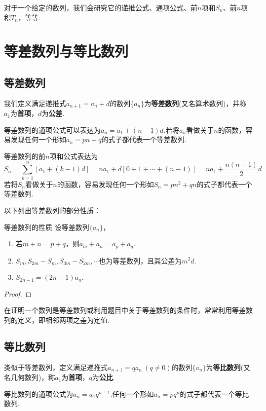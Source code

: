 \documentclass[lang=cn, zihao=5]{elegantbook}
\begin{document}
对于一个给定的数列，我们会研究它的递推公式、通项公式、前$n$项和$S_n$、前$n$项积$T_n$，等等.

\section{等差数列与等比数列}

\subsection{等差数列}

我们定义满足递推式$a_{n+1}=a_n+d$的数列$\{ a_n \}$为\textbf{等差数列}(又名算术数列)，并称$a_1$为\textbf{首项}，$d$为\textbf{公差}.

等差数列的通项公式可以表达为$a_n=a_1+(n-1)d$.若将$a_n$看做关于$n$的函数，容易发现任何一个形如$a_n=pn+q$的式子都代表一个等差数列.

等差数列的前$n$项和公式表达为$$S_n = \sum _{k=1}^{n} [a_1+(k-1)d] = na_1 + d[0+ 1 + \cdots +(n-1)] = na_1 + \frac{n(n-1)}{2}d$$
若将$S_n$看做关于$n$的函数，容易发现任何一个形如$S_n=pn^2+qn$的式子都代表一个等差数列.

以下列出等差数列的部分性质：

\begin{proposition}{等差数列的性质}
	设等差数列$\{ a_n \}$，
	\begin{enumerate}
		\item 若$m+n=p+q$，则$a_m+a_n=a_p+a_q$.
		\item $S_m,S_{2m}-S_m,S_{3m}-S_{2m},\cdots $也为等差数列，且其公差为$m^2d$.
		\item $S_{2n-1}=(2n-1)a_n$.
	\end{enumerate}
\end{proposition}
\begin{proof}
\end{proof}

在证明一个数列是等差数列或利用题目中关于等差数列的条件时，常常利用等差数列的定义，即相邻两项之差为定值.

\subsection{等比数列}

类似于等差数列，定义满足递推式$a_{n+1}=qa_n ~(q \neq 0)$的数列$\{ a_n \}$为\textbf{等比数列}(又名几何数列)，称$a_1$为\textbf{首项}，$q$为\textbf{公比}.

等比数列的通项公式为$a_n = a_1 q^{n-1}$.任何一个形如$a_n=pq^n$的式子都代表一个等比数列.
\end{document}
